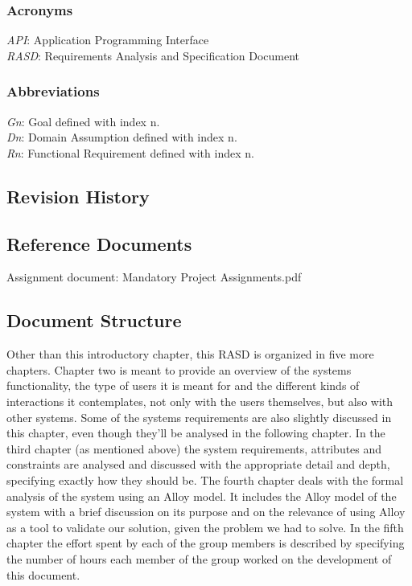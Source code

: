 \documentclass[12pt]{article}
\begin{document}
\subsubsection{Acronyms}
\textit{API}: Application Programming Interface\\
\textit{RASD}: Requirements Analysis and Specification Document
\subsubsection{Abbreviations}
\textit{Gn}: Goal defined with index n.\\
\textit{Dn}: Domain Assumption defined with index n.\\
\textit{Rn}: Functional Requirement defined with index n.


\subsection{Revision History}

\subsection{Reference Documents}
Assignment document: Mandatory Project Assignments.pdf

\subsection{Document Structure}
Other than this introductory chapter, this RASD is organized in five more chapters. Chapter two is meant to provide an overview of the systems functionality, the type of users it is meant for and the different kinds of interactions it contemplates, not only with the users themselves, but also with other systems. Some of the systems requirements are also slightly discussed in this chapter, even though they’ll be analysed in the following chapter. In the third chapter (as mentioned above) the system requirements, attributes and constraints are analysed and discussed with the appropriate detail and depth, specifying exactly how they should be.
The fourth chapter deals with the formal analysis of the system using an Alloy model. It includes the Alloy model of the system with a brief discussion on its purpose and on the relevance of using Alloy as a tool to validate our solution, given the problem we had to solve.
In the fifth chapter the effort spent by each of the group members is described by specifying the number of hours each member of the group worked on the development of this document.
\end{document}
